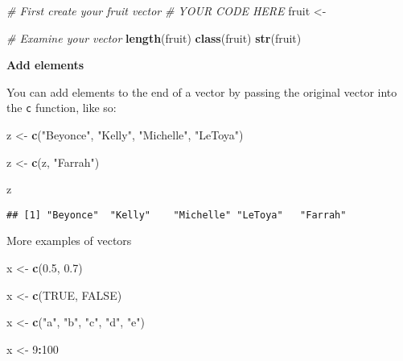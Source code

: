 \documentclass[
]{book}
\newenvironment{Shaded}{\begin{snugshade}}{\end{snugshade}}
\newcommand{\CommentTok}[1]{\textcolor[rgb]{0.56,0.35,0.01}{\textit{#1}}}
\newcommand{\DecValTok}[1]{\textcolor[rgb]{0.00,0.00,0.81}{#1}}
\newcommand{\FloatTok}[1]{\textcolor[rgb]{0.00,0.00,0.81}{#1}}
\newcommand{\KeywordTok}[1]{\textcolor[rgb]{0.13,0.29,0.53}{\textbf{#1}}}
\newcommand{\NormalTok}[1]{#1}
\newcommand{\OperatorTok}[1]{\textcolor[rgb]{0.81,0.36,0.00}{\textbf{#1}}}
\newcommand{\OtherTok}[1]{\textcolor[rgb]{0.56,0.35,0.01}{#1}}
\newcommand{\StringTok}[1]{\textcolor[rgb]{0.31,0.60,0.02}{#1}}
\begin{document}
\begin{Shaded}
\begin{Highlighting}[]
\CommentTok{\# First create your fruit vector}
\CommentTok{\# YOUR CODE HERE}
\NormalTok{fruit \textless{}{-}}

\StringTok{  }\CommentTok{\# Examine your vector}
\StringTok{  }\KeywordTok{length}\NormalTok{(fruit)}
\KeywordTok{class}\NormalTok{(fruit)}
\KeywordTok{str}\NormalTok{(fruit)}
\end{Highlighting}
\end{Shaded}

\textbf{Add elements}

You can add elements to the end of a vector by passing the original vector into the \texttt{c} function, like so:

\begin{Shaded}
\begin{Highlighting}[]
\NormalTok{z \textless{}{-}}\StringTok{ }\KeywordTok{c}\NormalTok{(}\StringTok{"Beyonce"}\NormalTok{, }\StringTok{"Kelly"}\NormalTok{, }\StringTok{"Michelle"}\NormalTok{, }\StringTok{"LeToya"}\NormalTok{)}

\NormalTok{z \textless{}{-}}\StringTok{ }\KeywordTok{c}\NormalTok{(z, }\StringTok{"Farrah"}\NormalTok{)}

\NormalTok{z}
\end{Highlighting}
\end{Shaded}

\begin{verbatim}
## [1] "Beyonce"  "Kelly"    "Michelle" "LeToya"   "Farrah"
\end{verbatim}

More examples of vectors

\begin{Shaded}
\begin{Highlighting}[]
\NormalTok{x \textless{}{-}}\StringTok{ }\KeywordTok{c}\NormalTok{(}\FloatTok{0.5}\NormalTok{, }\FloatTok{0.7}\NormalTok{)}

\NormalTok{x \textless{}{-}}\StringTok{ }\KeywordTok{c}\NormalTok{(}\OtherTok{TRUE}\NormalTok{, }\OtherTok{FALSE}\NormalTok{)}

\NormalTok{x \textless{}{-}}\StringTok{ }\KeywordTok{c}\NormalTok{(}\StringTok{"a"}\NormalTok{, }\StringTok{"b"}\NormalTok{, }\StringTok{"c"}\NormalTok{, }\StringTok{"d"}\NormalTok{, }\StringTok{"e"}\NormalTok{)}

\NormalTok{x \textless{}{-}}\StringTok{ }\DecValTok{9}\OperatorTok{:}\DecValTok{100}
\end{Highlighting}
\end{Shaded}
\end{document}
